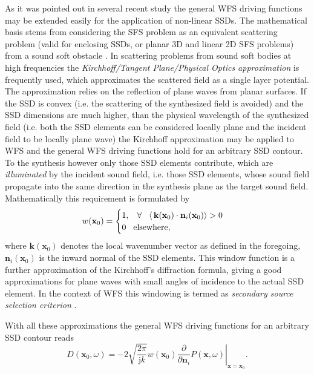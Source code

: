 \documentclass[12pt,a4paper]{article}
\newcommand{\ti}{\mathrm{j}}
\newcommand{\vx}{\mathbf{x}}
\newcommand{\vxo}{\mathbf{x}_0}
\begin{document}
As it was pointed out in several recent study \cite{Ahrens2012, Fazi2013:Equivalent_scattering, Zotter2013:uniqueness} the general WFS driving functions may be extended easily for the application of non-linear SSDs. The mathematical basis stems from considering the SFS problem as an equivalent scattering problem (valid for enclosing SSDs, or planar 3D and linear 2D SFS problems) from a sound soft obstacle \cite{Fazi2013:Equivalent_scattering}. In scattering problems from sound soft bodies at high frequencies the \emph{Kirchhoff/Tangent Plane/Physical Optics approximation} is frequently used, which approximates the scattered field as a single layer potential. The approximation relies on the reflection of plane waves from planar surfaces. If the SSD is convex (i.e. the scattering of the synthesized field is avoided) and the SSD dimensions are much higher, than the physical wavelength of the synthesized field (i.e. both the SSD elements can be considered locally plane and the incident field to be locally plane wave) the Kirchhoff approximation may be applied to WFS and the general WFS driving functions hold for an arbitrary SSD contour.
To the synthesis however only those SSD elements contribute, which are \emph{illuminated} by the incident sound field, i.e. those SSD elements, whose sound field propagate into the same direction in the synthesis plane as the target sound field. Mathematically this requirement is formulated by
\begin{equation}
w(\vxo) = \begin{cases}
                        1, \hspace{3mm} \forall \hspace{3mm} \langle\, \mathbf{k}(\vxo) \cdot \mathbf{n}_i(\vxo)\rangle > 0 \\
                        0  \hspace{3mm} \text{elsewhere},
                    \end{cases}
\end{equation}
where $\mathbf{k}(\vxo)$ denotes the local wavenumber vector as defined in the foregoing, $ \mathbf{n}_i(\vxo)$ is the inward normal of the SSD elements. This window function is a further approximation of the Kirchhoff's diffraction formula, giving a good approximations for plane waves with small angles of incidence to the actual SSD element.
In the context of WFS this windowing is termed as \emph{secondary source selection criterion} \cite{Spors2007, Spors2007:DAGA:SS_selection_criterion}.

With all these approximations the general WFS driving functions for an arbitrary SSD contour reads
\begin{equation}
D(\vxo,\omega) = -2 \sqrt{\frac{2\pi}{\ti k}} w(\vxo) \left. \frac{\partial}{\partial \mathbf{n}_i} P(\vx,\omega) \right|_{\vx = \vxo}.
\end{equation}
\end{document}
